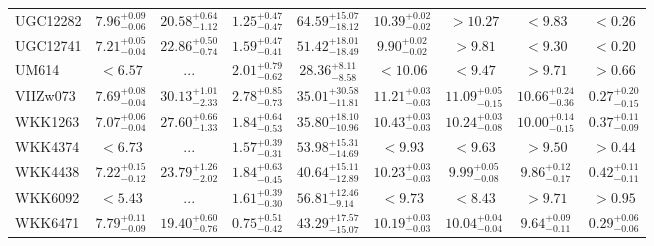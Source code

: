 \documentclass[onecolumn]{mn2e}
\begin{document}
{\begin{center}
\begin{longtable}{lcccccccc}
UGC12282 & $7.96_{-0.06}^{+0.09}$ & $20.58_{-1.12}^{+0.64}$ & $1.25_{-0.47}^{+0.47}$ &$64.59_{-18.12}^{+15.07}$ & $10.39_{-0.02}^{+0.02}$ & $>10.27$ & $<9.83$ & $<0.26$ \\
UGC12741 & $7.21_{-0.04}^{+0.05}$ & $22.86_{-0.74}^{+0.50}$ & $1.59_{-0.41}^{+0.47}$ &$51.42_{-18.49}^{+18.01}$ & $9.90_{-0.02}^{+0.02}$ & $>9.81$ & $<9.30$ & $<0.20$ \\
UM614 & $<6.57$ & ... & $2.01_{-0.62}^{+0.79}$ &$28.36_{-8.58}^{+8.11}$ & $<10.06$ & $<9.47$ & $>9.71$ & $>0.66$ \\
VIIZw073 & $7.69_{-0.04}^{+0.08}$ & $30.13_{-2.33}^{+1.01}$ & $2.78_{-0.73}^{+0.85}$ &$35.01_{-11.81}^{+30.58}$ & $11.21_{-0.03}^{+0.03}$ & $11.09_{-0.15}^{+0.05}$ & $10.66_{-0.36}^{+0.24}$ & $0.27_{-0.15}^{+0.20}$ \\
WKK1263 & $7.07_{-0.04}^{+0.06}$ & $27.60_{-1.33}^{+0.66}$ & $1.84_{-0.53}^{+0.64}$ &$35.80_{-10.96}^{+18.10}$ & $10.43_{-0.03}^{+0.03}$ & $10.24_{-0.08}^{+0.03}$ & $10.00_{-0.15}^{+0.14}$ & $0.37_{-0.09}^{+0.11}$ \\
WKK4374 & $<6.73$ & ... & $1.57_{-0.31}^{+0.39}$ &$53.98_{-14.69}^{+15.31}$ & $<9.93$ & $<9.63$ & $>9.50$ & $>0.44$ \\
WKK4438 & $7.22_{-0.12}^{+0.15}$ & $23.79_{-2.02}^{+1.26}$ & $1.84_{-0.45}^{+0.63}$ &$40.64_{-12.89}^{+15.11}$ & $10.23_{-0.03}^{+0.03}$ & $9.99_{-0.08}^{+0.05}$ & $9.86_{-0.17}^{+0.12}$ & $0.42_{-0.11}^{+0.11}$ \\
WKK6092 & $<5.43$ & ... & $1.61_{-0.30}^{+0.39}$ &$56.81_{-9.14}^{+12.46}$ & $<9.73$ & $<8.43$ & $>9.71$ & $>0.95$ \\
WKK6471 & $7.79_{-0.09}^{+0.11}$ & $19.40_{-0.76}^{+0.60}$ & $0.75_{-0.42}^{+0.51}$ &$43.29_{-15.07}^{+17.57}$ & $10.19_{-0.03}^{+0.03}$ & $10.04_{-0.04}^{+0.04}$ & $9.64_{-0.11}^{+0.09}$ & $0.29_{-0.06}^{+0.06}$ \\
\end{longtable}
\end{center}
}
\end{document}
